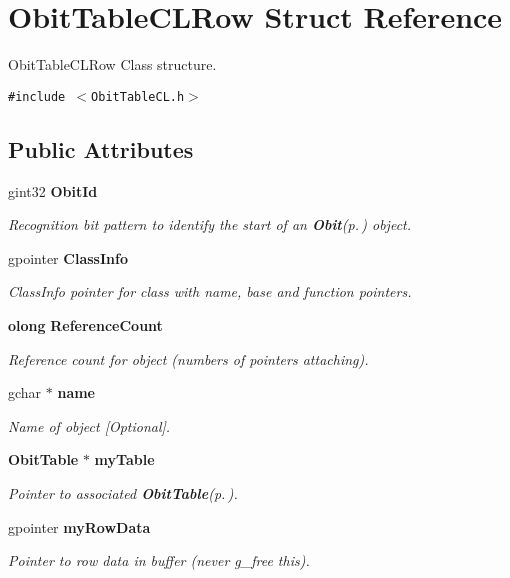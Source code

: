 \section{Obit\-Table\-CLRow Struct Reference}
\label{structObitTableCLRow}
Obit\-Table\-CLRow Class structure.  


{\tt \#include $<$Obit\-Table\-CL.h$>$}

\subsection*{Public Attributes}
\begin{CompactItemize}
\item 
gint32 {\bf Obit\-Id}
\begin{CompactList}\small\item\em Recognition bit pattern to identify the start of an {\bf Obit}{\rm (p.\,\pageref{structObit})} object. \item\end{CompactList}\item 
gpointer {\bf Class\-Info}
\begin{CompactList}\small\item\em Class\-Info pointer for class with name, base and function pointers. \item\end{CompactList}\item 
{\bf olong} {\bf Reference\-Count}
\begin{CompactList}\small\item\em Reference count for object (numbers of pointers attaching). \item\end{CompactList}\item 
gchar $\ast$ {\bf name}
\begin{CompactList}\small\item\em Name of object [Optional]. \item\end{CompactList}\item 
{\bf Obit\-Table} $\ast$ {\bf my\-Table}
\begin{CompactList}\small\item\em Pointer to associated {\bf Obit\-Table}{\rm (p.\,\pageref{structObitTable})}. \item\end{CompactList}\item 
gpointer {\bf my\-Row\-Data}
\begin{CompactList}\small\item\em Pointer to row data in buffer (never g\_\-free this). \item\end{CompactList}\item 

\end{CompactItemize}
